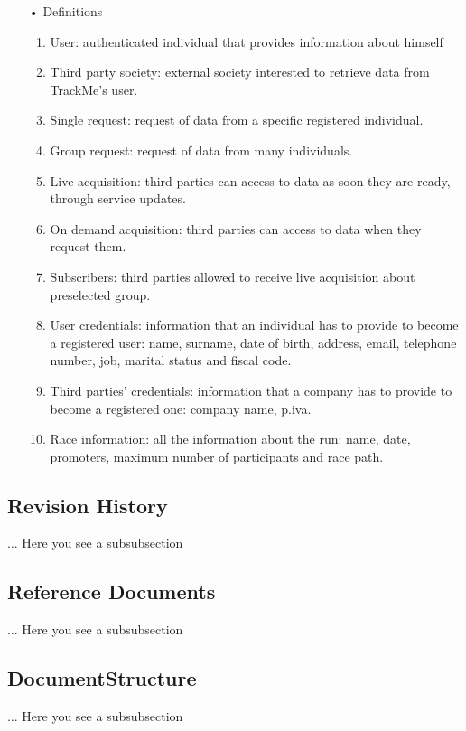 \begin{enumerate}
\item[•] {\Large Definitions}
	\begin{enumerate}
		\item User: authenticated individual that provides information about himself
		\item Third party society: external society interested to retrieve data from 					TrackMe's user.
		\item Single request: request of data from a specific registered individual.
		\item Group request: request of data from many individuals. 
		\item Live acquisition: third parties can access to data as soon they are ready, 				through service updates.
		\item On demand acquisition: third parties can access to data when they request 				them.
		\item Subscribers: third parties allowed to receive live acquisition about 						preselected	group.
		\item User credentials: information that an individual has to provide to become a 				registered user: name, surname, date of birth, address, email, telephone
			number, job, marital status and fiscal code. 
		\item Third parties' credentials: information that a company has to provide to 					become a registered one: company name, p.iva.
		\item Race information: all the information about the run: name, date, promoters, 				maximum number of participants and race path.
	\end{enumerate}
\end{enumerate}
	
\subsection{Revision History}
... Here you see a subsubsection
\subsection{Reference Documents}
... Here you see a subsubsection
\subsection{DocumentStructure}
... Here you see a subsubsection

